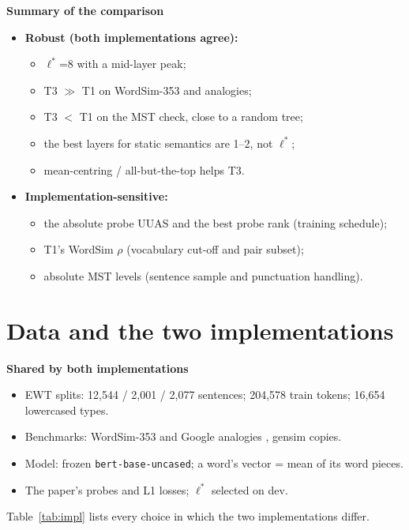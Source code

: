 \documentclass[11pt,a4paper]{article}
\newcommand{\lstar}{\ensuremath{\ell^*}}
\newcommand{\blk}[1]{\par\needspace{5\baselineskip}\smallskip\noindent\textbf{#1}\par\nobreak\vspace{1pt}}
\begin{document}
\blk{Summary of the comparison}
\begin{itemize}
\item \textbf{Robust (both implementations agree):}
\begin{itemize}
\item \lstar=8 with a mid-layer peak;
\item T3 $\gg$ T1 on WordSim-353 and analogies;
\item T3 $<$ T1 on the MST check, close to a random tree;
\item the best layers for static semantics are 1--2, not \lstar;
\item mean-centring / all-but-the-top helps T3.
\end{itemize}
\item \textbf{Implementation-sensitive:}
\begin{itemize}
\item the absolute probe UUAS and the best probe rank (training schedule);
\item T1's WordSim $\rho$ (vocabulary cut-off and pair subset);
\item absolute MST levels (sentence sample and punctuation handling).
\end{itemize}
\end{itemize}

\section{Data and the two implementations}\label{sec:impl}
\blk{Shared by both implementations}
\begin{itemize}
\item EWT splits: 12,544 / 2,001 / 2,077 sentences; 204,578 train tokens; 16,654 lowercased types.
\item Benchmarks: WordSim-353 \citep{ws353} and Google analogies \citep{mikolov}, gensim copies.
\item Model: frozen \texttt{bert-base-uncased}; a word's vector = mean of its word pieces.
\item The paper's probes and L1 losses; \lstar{} selected on dev.
\end{itemize}
Table~\ref{tab:impl} lists every choice in which the two implementations differ.
\end{document}
